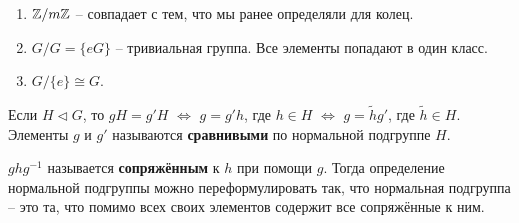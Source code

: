 \begin{example}
    \begin{enumerate}
        \item $\mathbb{Z} / m\mathbb{Z}$ -- совпадает с тем, что мы ранее определяли для
        колец.
        \item $G/G = \{eG\}$ -- тривиальная группа. Все элементы попадают
        в один класс.
        \item $G/\{e\} \cong G$.
    \end{enumerate}
\end{example}

\notice Если $H \lhd G$, то $gH = g'H$ $\Longleftrightarrow$ 
$g = g'h$, где $h \in H$ $\Longleftrightarrow$ 
$g = \widetilde{h}g'$, где $\widetilde{h} \in H$.\\
Элементы $g$ и $g'$ называются \textbf{сравнивыми} по нормальной
подгруппе $H$.

\notice $ghg^{-1}$ называется \textbf{сопряжённым} к $h$ при помощи $g$.
Тогда определение нормальной подгруппы можно переформулировать так, 
что нормальная подгруппа -- это та, что помимо всех своих элементов
содержит все сопряжённые к ним.